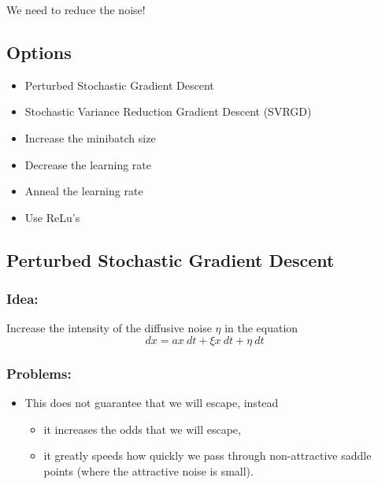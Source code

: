\documentclass[11pt]{article}
\providecommand{\tightlist}{%
      \setlength{\itemsep}{0pt}\setlength{\parskip}{0pt}}
\begin{document}
We need to reduce the noise!

    \hypertarget{options}{%
\subsection{Options}\label{options}}

\begin{itemize}
\tightlist
\item
  Perturbed Stochastic Gradient Descent
\item
  Stochastic Variance Reduction Gradient Descent (SVRGD)
\item
  Increase the minibatch size
\item
  Decrease the learning rate
\item
  Anneal the learning rate
\item
  Use ReLu's
\end{itemize}

    \hypertarget{perturbed-stochastic-gradient-descent}{%
\subsection{Perturbed Stochastic Gradient
Descent}\label{perturbed-stochastic-gradient-descent}}

\hypertarget{idea}{%
\subsubsection{Idea:}\label{idea}}

Increase the intensity of the diffusive noise \(\eta\) in the equation
\[dx = ax \:dt+\xi x \:dt +\eta\: dt\]

\hypertarget{problems}{%
\subsubsection{Problems:}\label{problems}}

\begin{itemize}
\tightlist
\item
  This does not guarantee that we will escape, instead

  \begin{itemize}
  \tightlist
  \item
    it increases the odds that we will escape,
  \item
    it greatly speeds how quickly we pass through non-attractive saddle
    points (where the attractive noise is small).
  \end{itemize}
\end{itemize}
\end{document}
